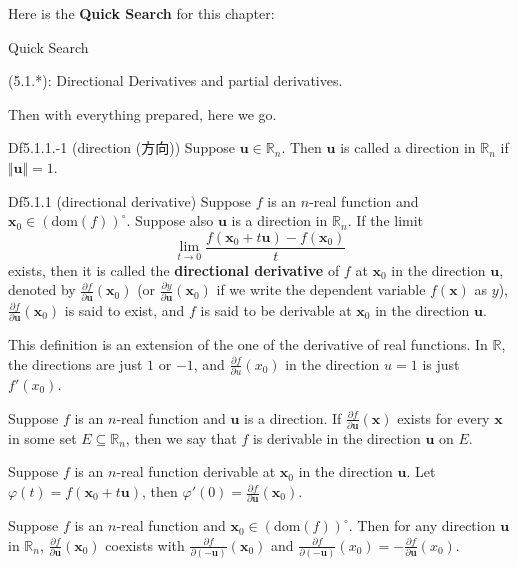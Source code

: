 \documentclass{article}
\newcommand{\parfrac}[2]{\frac{\partial #1}{\partial #2}}
\begin{document}
Here is the \textbf{Quick Search} for this chapter:
\begin{Th}{Quick Search}
    \begin{compactdesc}
        \item (5.1.*): Directional Derivatives and partial derivatives.
    \end{compactdesc}
\end{Th}

Then with everything prepared, here we go.

\begin{Df}{Df5.1.1.-1 (direction (方向))}
    Suppose $\pmb{u}\in\mathbb{R}_n$. Then $\pmb{u}$ is called a direction in $\mathbb{R}_n$ if $\Vert \pmb{u}\Vert = 1$.
\end{Df}

\begin{Df}{Df5.1.1 (directional derivative)}
    Suppose $f$ is an $n$-real function and $\pmb{x}_0\in (\text{dom}(f))^\circ$. Suppose also $\pmb{u}$ is a direction in $\mathbb{R}_n$. If the limit
    $$\lim_{t\to 0}\frac{f(\pmb{x}_0 + t\pmb{u}) - f(\pmb{x}_0)}{t}$$ 
    exists, then it is called the \textbf{directional derivative} of $f$ at $\pmb{x}_0$ in the direction $\pmb{u}$, denoted by $\parfrac{f}{\pmb{u}}(\pmb{x}_0)$ (or $\parfrac{y}{\pmb{u}}(\pmb{x}_0)$ if we write the dependent variable $f(\pmb{x})$ as $y$), $\parfrac{f}{\pmb{u}}(\pmb{x}_0)$ is said to exist, and $f$ is said to be derivable at $\pmb{x}_0$ in the direction $\pmb{u}$.
\end{Df}

\begin{Rmk}{}
    \begin{compactenum}
        \item \textcolor{Th}{This definition is an extension of the one of the derivative of real functions. In $\mathbb{R}$, the directions are just $1$ or $-1$, and $\parfrac{f}{u}(x_0)$ in the direction $u=1$ is just $f'(x_0)$.}
        \item \textcolor{Df}{Suppose $f$ is an $n$-real function and $\pmb{u}$ is a direction. If $\parfrac{f}{\pmb{u}}(\pmb{x})$ exists for every $\pmb{x}$ in some set $E\subseteq\mathbb{R}_n$, then we say that $f$ is derivable in the direction $\pmb{u}$ on $E$.}
        \item \textcolor{Th}{Suppose $f$ is an $n$-real function derivable at $\pmb{x}_0$ in the direction $\pmb{u}$. Let $\varphi(t) = f(\pmb{x}_0 + t\pmb{u})$, then $\varphi'(0) = \parfrac{f}{\pmb{u}}(\pmb{x}_0)$.}
        \item \textcolor{Th}{Suppose $f$ is an $n$-real function and $\pmb{x}_0\in (\text{dom}(f))^\circ$. Then for any direction $\pmb{u}$ in $\mathbb{R}_n$, $\parfrac{f}{\pmb{u}}(\pmb{x}_0)$ coexists with $\parfrac{f}{(-\pmb{u})}(\pmb{x}_0)$ and $\parfrac{f}{(-\pmb{u})}(x_0) = -\parfrac{f}{\pmb{u}}(x_0)$.}
    \end{compactenum}
\end{Rmk}
\end{document}
